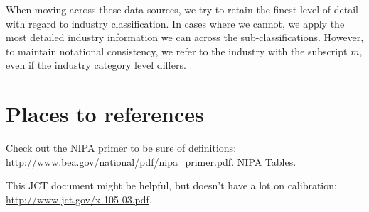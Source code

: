 \documentclass[article,11pt,letterpaper,fleqn]{article}
\theoremstyle{definition}
\numberwithin{equation}{section}
\begin{document}
When moving across these data sources, we try to retain the finest level of detail with regard to industry classification.  In cases where we cannot, we apply the most detailed industry information we can across the sub-classifications.  However, to maintain notational consistency, we refer to the industry with the subscript $m$, even if the industry category level differs.

\section{Places to references}

Check out the NIPA primer to be sure of definitions: \href{http://www.bea.gov/national/pdf/nipa\_primer.pdf}{http://www.bea.gov/national/pdf/nipa\_primer.pdf}.  \href{http://www.bea.gov/iTable/}{NIPA Tables}.

This JCT document might be helpful, but doesn't have a lot on calibration: \href{http://www.jct.gov/x-105-03.pdf}{http://www.jct.gov/x-105-03.pdf}.



\end{document}
